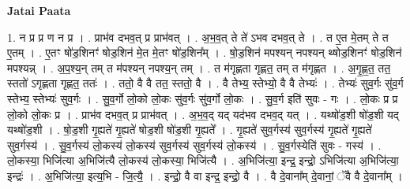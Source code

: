 \documentclass[17pt]{extarticle}
\begin{document}
\textbf{Jatai Paata} \newline

1. न प्र प्र ण न प्र । . प्राभ॑व दभव॒त् प्र प्राभ॑वत् । . अ॒भ॒व॒त् ते ते॑ ऽभव दभव॒त् ते । . त ए॒त मे॒तम् ते त ए॒तम् । . ए॒तꣳ षो॑ड॒शिनꣳ॑ षोड॒शिन॑ मे॒त मे॒तꣳ षो॑ड॒शिन᳚म् । . षो॒ड॒शिन॑ मपश्यन् नपश्यन् थ्षोड॒शिनꣳ॑ षोड॒शिन॑ मपश्यन्न् । . अ॒प॒श्य॒न् तम् त म॑पश्यन् नपश्य॒न् तम् । . त म॑गृह्णता गृह्णत॒ तम् त म॑गृह्णत । . अ॒गृ॒ह्ण॒त॒ तत॒ स्ततो॑ ऽगृह्णता गृह्णत॒ ततः॑ । . ततो॒ वै वै तत॒ स्ततो॒ वै । . वै तेभ्य॒ स्तेभ्यो॒ वै वै तेभ्यः॑ । . तेभ्यः॑ सुव॒र्गः सु॑व॒र्ग स्तेभ्य॒ स्तेभ्यः॑ सुव॒र्गः । . सु॒व॒र्गो लो॒को लो॒कः सु॑व॒र्गः सु॑व॒र्गो लो॒कः । . सु॒व॒र्ग इति॑ सुवः - गः । . लो॒कः प्र प्र लो॒को लो॒कः प्र । . प्राभ॑व दभव॒त् प्र प्राभ॑वत् । . अ॒भ॒व॒द् यद् यद॑भव दभव॒द् यत् । . यथ्षो॑ड॒शी षो॑ड॒शी यद् यथ्षो॑ड॒शी । . षो॒ड॒शी गृ॒ह्यते॑ गृ॒ह्यते॑ षोड॒शी षो॑ड॒शी गृ॒ह्यते᳚ । . गृ॒ह्यते॑ सुव॒र्गस्य॑ सुव॒र्गस्य॑ गृ॒ह्यते॑ गृ॒ह्यते॑ सुव॒र्गस्य॑ । . सु॒व॒र्गस्य॑ लो॒कस्य॑ लो॒कस्य॑ सुव॒र्गस्य॑ सुव॒र्गस्य॑ लो॒कस्य॑ । . सु॒व॒र्गस्येति॑ सुवः - गस्य॑ । . लो॒कस्या॒ भिजि॑त्या अ॒भिजि॑त्यै लो॒कस्य॑ लो॒कस्या॒ भिजि॑त्यै । . अ॒भिजि॑त्या॒ इन्द्र॒ इन्द्रो॒ ऽभिजि॑त्या अ॒भिजि॑त्या॒ इन्द्रः॑ । . अ॒भिजि॑त्या॒ इत्य॒भि - जि॒त्यै॒ । . इन्द्रो॒ वै वा इन्द्र॒ इन्द्रो॒ वै । . वै दे॒वाना᳚म् दे॒वानां॒ ॅवै वै दे॒वाना᳚म् । \newline
\end{document}
